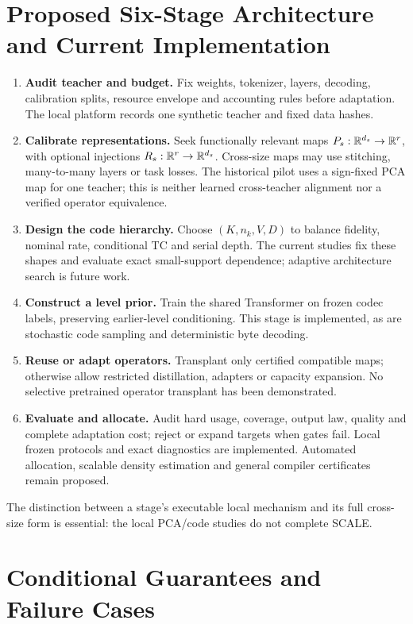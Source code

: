 \documentclass[11pt,a4paper]{article}
\begin{document}
\section{Proposed Six-Stage Architecture and Current Implementation}
\begin{enumerate}
\item \textbf{Audit teacher and budget.} Fix weights, tokenizer, layers, decoding,
calibration splits, resource envelope and accounting rules before adaptation.
The local platform records one synthetic teacher and fixed data hashes.
\item \textbf{Calibrate representations.} Seek functionally relevant maps
\(P_s:\mathbb{R}^{d_s}\to\mathbb{R}^r\), with optional injections \(R_s:\mathbb{R}^r\to\mathbb{R}^{d_s}\).
Cross-size maps may use stitching, many-to-many layers or task losses.
The historical pilot uses a sign-fixed PCA map for one teacher; this is neither
learned cross-teacher alignment nor a verified operator equivalence.
\item \textbf{Design the code hierarchy.} Choose \((K,n_k,V,D)\) to balance
fidelity, nominal rate, conditional TC and serial depth. The current studies fix
these shapes and evaluate exact small-support dependence; adaptive architecture
search is future work.
\item \textbf{Construct a level prior.} Train the shared Transformer on frozen
codec labels, preserving earlier-level conditioning. This stage is implemented,
as are stochastic code sampling and deterministic byte decoding.
\item \textbf{Reuse or adapt operators.} Transplant only certified compatible
maps; otherwise allow restricted distillation, adapters or capacity expansion.
No selective pretrained operator transplant has been demonstrated.
\item \textbf{Evaluate and allocate.} Audit hard usage, coverage, output law,
quality and complete adaptation cost; reject or expand targets when gates fail.
Local frozen protocols and exact diagnostics are implemented. Automated
allocation, scalable density estimation and general compiler certificates
remain proposed.
\end{enumerate}
The distinction between a stage's executable local mechanism and its full
cross-size form is essential: the local PCA/code studies do not complete SCALE.

\section{Conditional Guarantees and Failure Cases}
\end{document}
